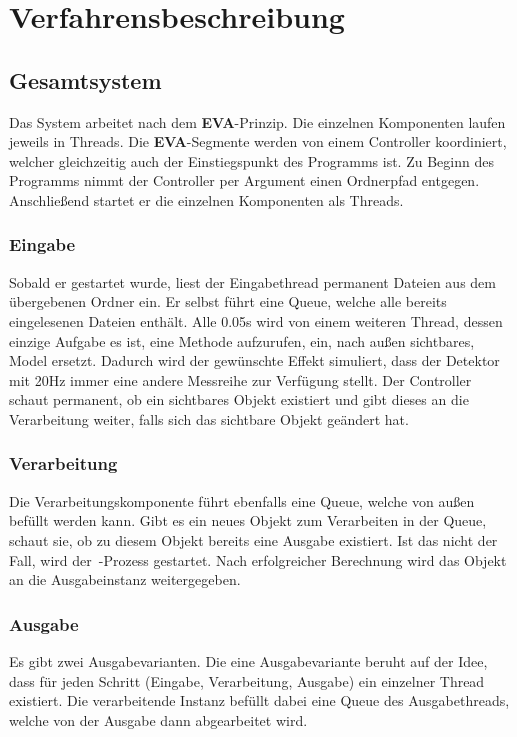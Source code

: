 \chapter{Verfahrensbeschreibung}\label{ch:verfahrensbeschreibung}


\section{Gesamtsystem}\label{sec:gesamtsystem}
Das System arbeitet nach dem \textbf{EVA}-Prinzip.
Die einzelnen Komponenten laufen jeweils in Threads.
Die \textbf{EVA}-Segmente werden von einem Controller koordiniert, welcher gleichzeitig auch der Einstiegspunkt des Programms ist.
Zu Beginn des Programms nimmt der Controller per Argument einen Ordnerpfad entgegen.
Anschließend startet er die einzelnen Komponenten als Threads.

\subsection{Eingabe}\label{subsec:eingabe}
Sobald er gestartet wurde, liest der Eingabethread permanent Dateien aus dem übergebenen Ordner ein.
Er selbst führt eine Queue, welche alle bereits eingelesenen Dateien enthält.
Alle 0.05s wird von einem weiteren Thread, dessen einzige Aufgabe es ist, eine Methode aufzurufen, ein, nach außen sichtbares, Model ersetzt.
Dadurch wird der gewünschte Effekt simuliert, dass der Detektor mit 20Hz immer eine andere Messreihe zur Verfügung stellt.
Der Controller schaut permanent, ob ein sichtbares Objekt existiert und gibt dieses an die Verarbeitung weiter, falls sich das sichtbare Objekt geändert hat.

\subsection{Verarbeitung}\label{subsec:verarbeitung}
Die Verarbeitungskomponente führt ebenfalls eine Queue, welche von außen befüllt werden kann.
Gibt es ein neues Objekt zum Verarbeiten in der Queue, schaut sie, ob zu diesem Objekt bereits eine Ausgabe existiert.
Ist das nicht der Fall, wird der~-Prozess gestartet.
Nach erfolgreicher Berechnung wird das Objekt an die Ausgabeinstanz weitergegeben.

\subsection{Ausgabe}\label{subsec:ausgabe}
Es gibt zwei Ausgabevarianten.
Die eine Ausgabevariante beruht auf der Idee, dass für jeden Schritt (Eingabe, Verarbeitung, Ausgabe) ein einzelner Thread existiert.
Die verarbeitende Instanz befüllt dabei eine Queue des Ausgabethreads, welche von der Ausgabe dann abgearbeitet wird.\\


